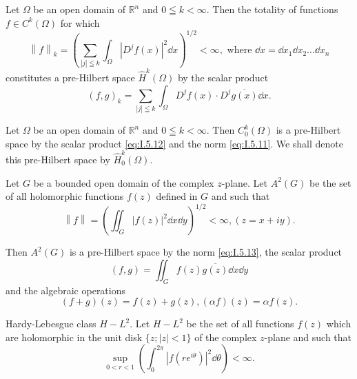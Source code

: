 \begin{example}\label{ex:I.5.Example.3} Let $\Omega$ be an open domain of $\mathbb{R}^{n}$ and $0 \leqq k < \infty$. Then the totality of functions $f \in C^k(\Omega)$ for which 
\begin{equation}\label{eq:I.5.11}
\left\| f \right\|_{k} = \left(\sum\limits_{| j | \leqq k} \int_{\Omega} \left| D ^{j} f (x) \right| ^{2} \dd x\right) ^{1/2} < \infty , \text{ where } \dd x = \dd x_{1} \dd x_{2} \dots \dd x_{n}
\end{equation}
constitutes a pre-Hilbert space $\hat{H}^k (\Omega)$ by the scalar product 
\begin{equation}\label{eq:I.5.12}
(f, g)_{k} = \sum\limits_{| j | \leqq k} \int_{\Omega} D ^{j} f (x) \cdot D ^{j} \overline {{g (x)}} \dd x.
\end{equation}
\end{example}

\begin{example}\label{ex:I.5.Example.4} Let $\Omega$ be an open domain of $\mathbb{R}^{n}$ and $0 \leqq k < \infty$. Then $C_0^k(\Omega)$ is a pre-Hilbert space by the scalar product \eqref{eq:I.5.12} and the norm \eqref{eq:I.5.11}. We shall denote this pre-Hilbert space by $\hat{H}_0^k(\Omega)$. 
\end{example}

\begin{example}\label{ex:I.5.Example.5} Let $G$ be a bounded open domain of the complex $z$-plane. Let $A^{2}(G)$ be the set of all holomorphic functions $f(z)$ defined in $G$ and such that 
\begin{equation}\label{eq:I.5.13}
\left\| f \right\| = \left(\iint_{G} | f (z) | ^{2} \dd x \dd y\right) ^{1/2} < \infty , (z = x + i y).
\end{equation}
\end{example}

Then $A^2(G)$ is a pre-Hilbert space by the norm \eqref{eq:I.5.13}, the scalar product 
\begin{equation}\label{eq:I.5.14}
(f, g) = \iint_{G} f (z) \overline {{g (z)}} \dd x \dd y
\end{equation}
and the algebraic operations 
\[
(f + g) (z) = f (z) + g (z), (\alpha f) (z) = \alpha f (z).
\]

\begin{example}\label{ex:I.5.Example.6} Hardy-Lebesgue class $H- L^2$. Let $H- L^2$ be the set of all functions $f(z)$ which are holomorphic in the unit disk $\{z; |z| < 1\}$ of the complex $z$-plane and such that 
\begin{equation}\label{eq:I.5.15}
\sup\limits_{0<r<1} \left(\int_{0} ^{2 \pi} | f (r e ^{i \theta}) | ^{2} \dd \theta\right) < \infty .
\end{equation}
\end{example}


